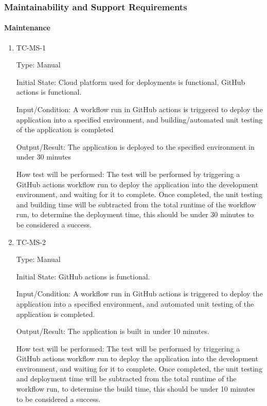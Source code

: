 \documentclass[12pt, titlepage]{article}
\begin{document}
\subsubsection{Maintainability and Support Requirements}

\paragraph{Maintenance}

\begin{enumerate}

  \item{TC-MS-1\\}

    Type: Manual

    Initial State: Cloud platform used for deployments is functional,
    GitHub actions is functional.

    Input/Condition: A workflow run in GitHub actions is triggered to
    deploy the application into a specified environment, and
    building/automated unit testing of the application is completed

    Output/Result: The application is deployed to the specified
    environment in under 30 minutes

    How test will be performed: The test will be performed by
    triggering a GitHub actions workflow run to deploy the application
    into the development environment, and waiting for it to complete.
    Once completed, the unit testing and building time will be subtracted
    from the total runtime of the workflow run, to determine the
    deployment time, this should be under 30 minutes to be considered a success.

  \item{TC-MS-2\\}

    Type: Manual

    Initial State: GitHub actions is functional.

    Input/Condition: A workflow run in GitHub actions is triggered to
    deploy the application into a specified environment, and
    automated unit testing of the application is completed.

    Output/Result: The application is built in under 10 minutes.

    How test will be performed: The test will be performed by
    triggering a GitHub actions workflow run to deploy the application
    into the development environment, and waiting for it to complete.
    Once completed, the unit testing and deployment time will be subtracted
    from the total runtime of the workflow run, to determine the
    build time, this should be under 10 minutes to be considered a success.


\end{enumerate}
\end{document}
